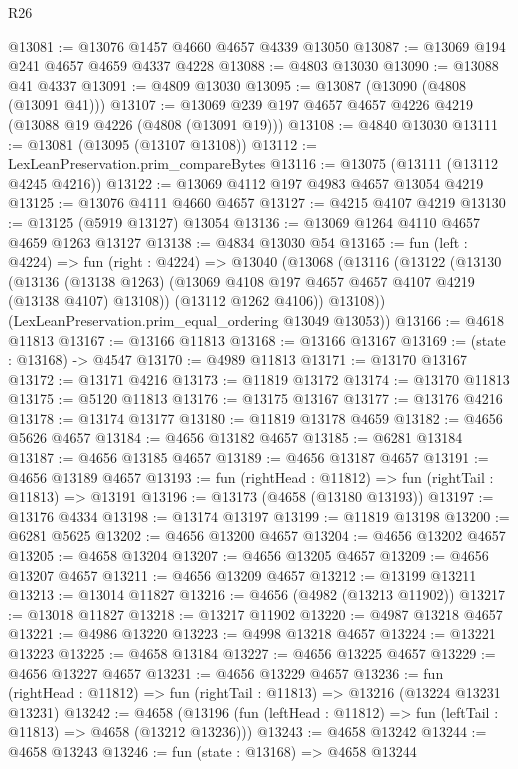 \begin{lexlean}{R26}
\begin{coremodule}
@13081 := @13076 @1457 @4660 @4657 @4339 @13050
@13087 := @13069 @194 @241 @4657 @4659 @4337 @4228
@13088 := @4803 @13030
@13090 := @13088 @41 @4337
@13091 := @4809 @13030
@13095 := @13087 (@13090 (@4808 (@13091 @41)))
@13107 := @13069 @239 @197 @4657 @4657 @4226 @4219 (@13088 @19 @4226 (@4808 (@13091 @19)))
@13108 := @4840 @13030
@13111 := @13081 (@13095 (@13107 @13108))
@13112 := LexLeanPreservation.prim_compareBytes
@13116 := @13075 (@13111 (@13112 @4245 @4216))
@13122 := @13069 @4112 @197 @4983 @4657 @13054 @4219
@13125 := @13076 @4111 @4660 @4657
@13127 := @4215 @4107 @4219
@13130 := @13125 (@5919 @13127) @13054
@13136 := @13069 @1264 @4110 @4657 @4659 @1263 @13127
@13138 := @4834 @13030 @54
@13165 := fun (left : @4224) =>
  fun (right : @4224) =>
  @13040
    (@13068
      (@13116
        (@13122
          (@13130
            (@13136
              (@13138 @1263)
              (@13069 @4108 @197 @4657 @4657 @4107 @4219 (@13138 @4107) @13108))
            (@13112 @1262 @4106))
          @13108))
      (LexLeanPreservation.prim_equal_ordering @13049 @13053))
@13166 := @4618 @11813
@13167 := @13166 @11813
@13168 := @13166 @13167
@13169 := (state : @13168) -> @4547
@13170 := @4989 @11813
@13171 := @13170 @13167
@13172 := @13171 @4216
@13173 := @11819 @13172
@13174 := @13170 @11813
@13175 := @5120 @11813
@13176 := @13175 @13167
@13177 := @13176 @4216
@13178 := @13174 @13177
@13180 := @11819 @13178 @4659
@13182 := @4656 @5626 @4657
@13184 := @4656 @13182 @4657
@13185 := @6281 @13184
@13187 := @4656 @13185 @4657
@13189 := @4656 @13187 @4657
@13191 := @4656 @13189 @4657
@13193 := fun (rightHead : @11812) => fun (rightTail : @11813) => @13191
@13196 := @13173 (@4658 (@13180 @13193))
@13197 := @13176 @4334
@13198 := @13174 @13197
@13199 := @11819 @13198
@13200 := @6281 @5625
@13202 := @4656 @13200 @4657
@13204 := @4656 @13202 @4657
@13205 := @4658 @13204
@13207 := @4656 @13205 @4657
@13209 := @4656 @13207 @4657
@13211 := @4656 @13209 @4657
@13212 := @13199 @13211
@13213 := @13014 @11827
@13216 := @4656 (@4982 (@13213 @11902))
@13217 := @13018 @11827
@13218 := @13217 @11902
@13220 := @4987 @13218 @4657
@13221 := @4986 @13220
@13223 := @4998 @13218 @4657
@13224 := @13221 @13223
@13225 := @4658 @13184
@13227 := @4656 @13225 @4657
@13229 := @4656 @13227 @4657
@13231 := @4656 @13229 @4657
@13236 := fun (rightHead : @11812) => fun (rightTail : @11813) => @13216 (@13224 @13231 @13231)
@13242 := @4658
    (@13196 (fun (leftHead : @11812) => fun (leftTail : @11813) => @4658 (@13212 @13236)))
@13243 := @4658 @13242
@13244 := @4658 @13243
@13246 := fun (state : @13168) => @4658 @13244

\end{coremodule}
\end{lexlean}
